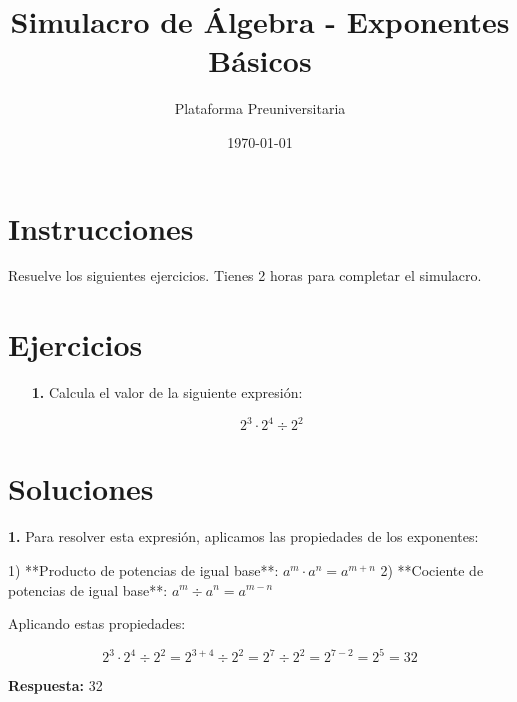 \documentclass[12pt,a4paper]{article}
\title{\Huge \textbf{Simulacro de Álgebra - Exponentes Básicos}}
\author{Plataforma Preuniversitaria}
\date{\today}
\begin{document}
\maketitle

\section*{Instrucciones}
Resuelve los siguientes ejercicios. Tienes 2 horas para completar el simulacro.

\section*{Ejercicios}


\begin{enumerate}
\item[\textbf{1.}] Calcula el valor de la siguiente expresión:

$$2^3 \cdot 2^4 \div 2^2$$
\end{enumerate}

\vspace{1cm}


\newpage
\section*{Soluciones}


\textbf{1.} Para resolver esta expresión, aplicamos las propiedades de los exponentes:

1) **Producto de potencias de igual base**: $a^m \cdot a^n = a^{m+n}$
2) **Cociente de potencias de igual base**: $a^m \div a^n = a^{m-n}$

Aplicando estas propiedades:

$$2^3 \cdot 2^4 \div 2^2 = 2^{3+4} \div 2^2 = 2^7 \div 2^2 = 2^{7-2} = 2^5 = 32$$

\textbf{Respuesta:} 32

\vspace{0.5cm}
\end{document}
